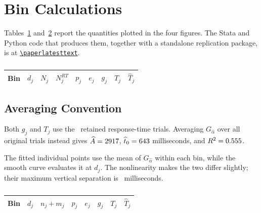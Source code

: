 \section{Bin Calculations}
\label{app:bin-results}

Tables~\ref{tab:individual-bins} and~\ref{tab:pooled-bins} report the
quantities plotted in the four figures. The Stata and Python code that
produces them, together with a standalone replication package, is at
\href{\paperrepourl}{\nolinkurl{\paperlatesttext}}.

\begin{table}[H]
  \centering
  \caption{}
  \label{tab:individual-bins}
  \small
  \setlength{\tabcolsep}{4pt}
  \begin{tabular}{@{}rrrrrrrrr@{}}
    \toprule
    Bin & $d_j$ & $N_j$ & $N_j^{RT}$ & $p_j$ & $e_j$ & $g_j$
        & $T_j$ & $\widehat T_j$ \\
    \midrule
    
  \end{tabular}
\end{table}

\subsection{Averaging Convention}
Both $g_j$ and $T_j$ use the \RTKept\ retained response-time trials.
Averaging $G_{\widehat\alpha}$ over all original trials instead gives
$\widehat A=2917$, $\widehat t_0=643$
milliseconds, and $R^2=0.555$.

The fitted individual points use the mean of $G_{\widehat\alpha}$ within
each bin, while the smooth curve evaluates it at $d_j$. The nonlinearity
makes the two differ slightly; their maximum vertical separation is
\CurveGapIndividual\ milliseconds.

\begin{table}[H]
  \centering
  \caption{}
  \label{tab:pooled-bins}
  \small
  \setlength{\tabcolsep}{5pt}
  \begin{tabular}{@{}rrrrrrrr@{}}
    \toprule
    Bin & $d_j$ & $n_j+m_j$ & $p_j$ & $e_j$ & $g_j$
        & $T_j$ & $\widehat T_j$ \\
    \midrule
    
  \end{tabular}
\end{table}
